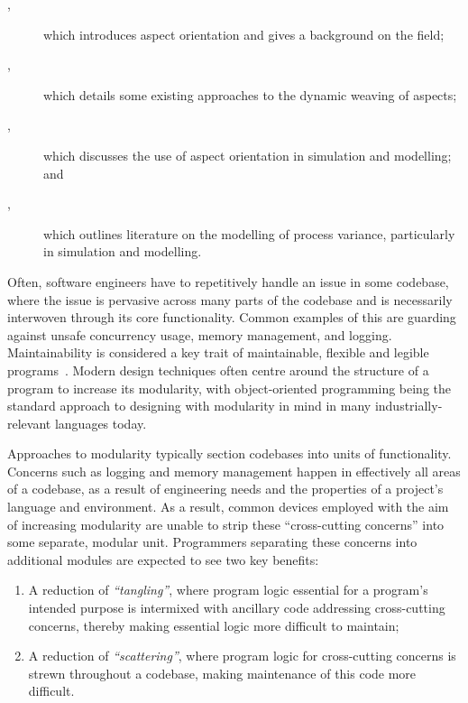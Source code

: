 \begin{description}

    \item[,] which introduces aspect orientation and
    gives a background on the field;
    \item[,] which details some existing approaches
    to the dynamic weaving of aspects;
    \item[,] which discusses the use of aspect
    orientation in simulation and modelling; and
    \item[,] which outlines literature on the modelling
    of process variance, particularly in simulation and modelling.

\end{description}



Often, software engineers have to repetitively handle an issue in some codebase,
where the issue is pervasive across many parts of the codebase and is
necessarily interwoven through its core functionality. Common examples of this
are guarding against unsafe concurrency usage, memory management, and logging.
Maintainability is considered a key trait of maintainable, flexible and legible
programs~\cite{Parnas_1972}. Modern design techniques often centre around the
structure of a program to increase its modularity, with object-oriented
programming being the standard approach to designing with modularity in mind in
many industrially-relevant languages today. 

Approaches to modularity typically section codebases into units of
functionality. Concerns such as logging and memory management happen in
effectively all areas of a codebase, as a result of engineering needs and the
properties of a project's language and environment. As a result, common devices
employed with the aim of increasing modularity are unable to strip these
``cross-cutting concerns'' into some separate, modular unit. Programmers
separating these concerns into additional modules are expected to see two key
benefits:

\begin{enumerate}
    \item A reduction of \emph{``tangling''}, where program logic essential for
    a program's intended purpose is intermixed with ancillary code addressing
    cross-cutting concerns, thereby making essential logic more difficult to maintain;
    \item A reduction of \emph{``scattering''}, where program logic for
    cross-cutting concerns is strewn throughout a codebase, making maintenance
    of this code more difficult.
\end{enumerate}

